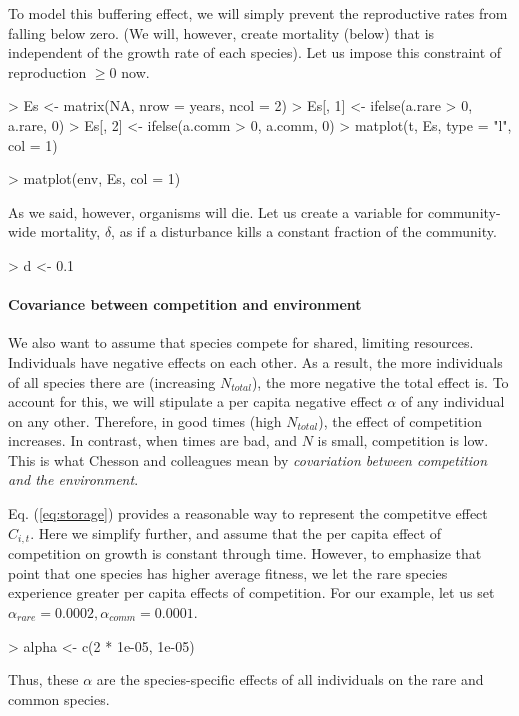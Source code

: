 To model this buffering effect, we will simply prevent the reproductive rates from falling below zero. (We will, however, create mortality (below) that is independent of the growth rate of each species). Let us impose this constraint of reproduction $\ge 0$ now. 
\begin{Schunk}
\begin{Sinput}
> Es <- matrix(NA, nrow = years, ncol = 2)
> Es[, 1] <- ifelse(a.rare > 0, a.rare, 0)
> Es[, 2] <- ifelse(a.comm > 0, a.comm, 0)
> matplot(t, Es, type = "l", col = 1)
\end{Sinput}
\end{Schunk}
\begin{Schunk}
\begin{Sinput}
> matplot(env, Es, col = 1)
\end{Sinput}
\end{Schunk}
As we said, however, organisms will die. Let us create a variable for community-wide mortality, $\delta$, as if a disturbance kills a constant fraction of the community.
\begin{Schunk}
\begin{Sinput}
> d <- 0.1
\end{Sinput}
\end{Schunk}

\paragraph{Covariance between competition and environment}
We also want to assume that species compete for shared, limiting resources. Individuals have negative effects on each other. As a result, the more individuals of all species there are (increasing $N_{total}$), the more negative the total effect is. To account for this, we will stipulate a per capita negative effect $\alpha$ of any individual on any other. Therefore, in good times (high $N_{total}$), the effect of competition increases. In contrast, when times are bad, and $N$ is small, competition is low. This is what Chesson and colleagues mean by \emph{covariation between competition and the environment}. 

Eq. (\ref{eq:storage}) provides a reasonable way to represent the competitve effect $C_{i,t}$. Here we simplify further, and assume that the per capita effect of competition on growth is constant  through time. However, to emphasize that point that one species has higher average fitness, we let the rare species experience greater per capita effects of competition. For our example, let us set $\alpha_{rare}=0.0002, \alpha_{comm}=0.0001$.
\begin{Schunk}
\begin{Sinput}
> alpha <- c(2 * 1e-05, 1e-05)
\end{Sinput}
\end{Schunk}
Thus, these $\alpha$ are the species-specific effects of all individuals on the rare and common species.


